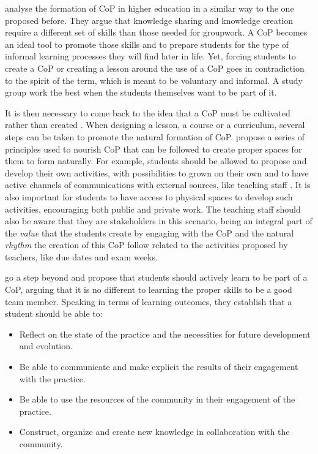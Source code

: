 \textcite{cremers_2008} analyse the formation of \ac{CoP} in higher education in a similar way to the one proposed before. They argue that knowledge sharing and knowledge creation require a different set of skills than those needed for groupwork. A \ac{CoP}
becomes an ideal tool to promote those skills and to prepare students for the type of informal learning processes they will find later in life. Yet, forcing students to create a \ac{CoP} or creating a lesson around the use of a CoP goes in contradiction to
the spirit of the term, which is meant to be voluntary and informal. A study group work the best when the students themselves want to be part of it.

It is then necessary to come back to the idea that a \ac{CoP} must be cultivated rather than created \parencite{wenger_2002}. When designing a lesson, a course or a curriculum, several steps can be taken to promote the natural formation of \ac{CoP}.
\textcite{klein_2008} propose a series of principles used to nourish \ac{CoP} that can be followed to create proper spaces for them to form naturally. For example, students should be allowed to propose and develop their own activities, with possibilities to
grown on their own and to have active channels of communications with external sources, like teaching staff . It is also important for students to have access to physical spaces to develop such activities, encouraging both public and private work. The teaching
staff should also be aware that they are stakeholders in this scenario, being an integral part of the \emph{value} that the students create by engaging with the \ac{CoP} and the natural \emph{rhythm} the creation of this \ac{CoP} follow related to the activities
proposed by teachers, like due dates and exam weeks.

\textcite{cremers_2008} go a step beyond and propose that students should actively learn to be part of a \ac{CoP}, arguing that it is no different to learning the proper skills to be a good team member. Speaking in terms of learning outcomes, they establish that a
student should be able to:

\begin{itemize}
    \item Reflect on the state of the practice and the necessities for future development and evolution.
    \item Be able to communicate and make explicit the results of their engagement with the practice.
    \item Be able to use the resources of the community in their engagement of the practice.
    \item Construct, organize and create new knowledge in collaboration with the community.
\end{itemize}

